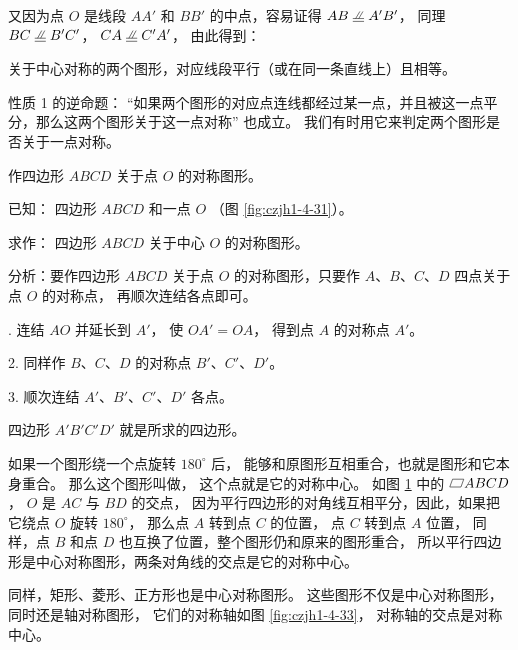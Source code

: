 又因为点 $O$ 是线段 $AA'$ 和 $BB'$ 的中点，容易证得 $AB \pxqdy A'B'$，
同理 $BC \pxqdy B'C'$， $CA \pxqdy C'A'$， 由此得到：

\begin{xingzhi}[性质2]
    关于中心对称的两个图形，对应线段平行（或在同一条直线上）且相等。
\end{xingzhi}

性质 1 的逆命题： “如果两个图形的对应点连线都经过某一点，并且被这一点平分，那么这两个图形关于这一点对称” 也成立。
我们有时用它来判定两个图形是否关于一点对称。


\liti[0] 作四边形 $ABCD$ 关于点 $O$ 的对称图形。

已知： 四边形 $ABCD$ 和一点 $O$ （图 \ref{fig:czjh1-4-31}）。

求作： 四边形 $ABCD$ 关于中心 $O$ 的对称图形。

分析：要作四边形 $ABCD$ 关于点 $O$ 的对称图形，只要作 $A$、$B$、$C$、$D$ 四点关于点 $O$ 的对称点，
再顺次连结各点即可。

. 连结 $AO$ 并延长到 $A'$， 使 $OA' = OA$， 得到点 $A$ 的对称点 $A'$。

2. 同样作 $B$、$C$、$D$ 的对称点 $B'$、$C'$、$D'$。

3. 顺次连结 $A'$、$B'$、$C'$、$D'$ 各点。

四边形 $A'B'C'D'$ 就是所求的四边形。


\begin{figure}[htbp]
    \centering
    \begin{minipage}[b]{7cm}
        \centering
        
        \caption{}\label{fig:czjh1-4-31}
    \end{minipage}
    \qquad
    \begin{minipage}[b]{7cm}
        \centering
        
        \caption{}\label{fig:czjh1-4-32}
    \end{minipage}
\end{figure}

如果一个图形绕一个点旋转 $180^\circ$ 后， 能够和原图形互相重合，也就是图形和它本身重合。
那么这个图形叫做， 这个点就是它的对称中心。
如图 \ref{fig:czjh1-4-32} 中的 $\pxsbx ABCD$， $O$ 是 $AC$ 与 $BD$ 的交点，
因为平行四边形的对角线互相平分，因此，如果把它绕点 $O$ 旋转 $180^\circ$，
那么点 $A$ 转到点 $C$ 的位置， 点 $C$ 转到点 $A$ 位置，
同样，点 $B$ 和点 $D$ 也互换了位置，整个图形仍和原来的图形重合，
所以平行四边形是中心对称图形，两条对角线的交点是它的对称中心。

同样，矩形、菱形、正方形也是中心对称图形。
这些图形不仅是中心对称图形，同时还是轴对称图形，
它们的对称轴如图 \ref{fig:czjh1-4-33}， 对称轴的交点是对称中心。

